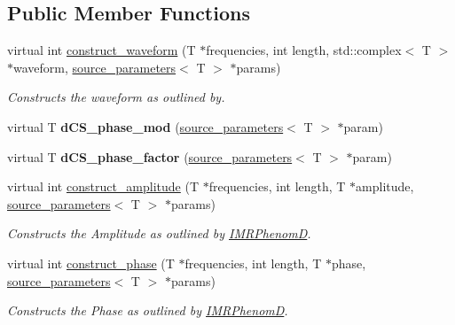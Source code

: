 \subsection*{Public Member Functions}
\begin{DoxyCompactItemize}
\item 
virtual int \hyperlink{classdCS__IMRPhenomD_ad6fa19d2181da900203c2bf1e182a60b}{construct\+\_\+waveform} (T $\ast$frequencies, int length, std\+::complex$<$ T $>$ $\ast$waveform, \hyperlink{structsource__parameters}{source\+\_\+parameters}$<$ T $>$ $\ast$params)
\begin{DoxyCompactList}\small\item\em Constructs the waveform as outlined by. \end{DoxyCompactList}\item 
\mbox{\label{classdCS__IMRPhenomD_a2325998d0af08e464343d7ae09c085be}} 
virtual T {\bfseries d\+C\+S\+\_\+phase\+\_\+mod} (\hyperlink{structsource__parameters}{source\+\_\+parameters}$<$ T $>$ $\ast$param)
\item 
\mbox{\label{classdCS__IMRPhenomD_ae2aeaa27abdfe564c0e87b20da4a1964}} 
virtual T {\bfseries d\+C\+S\+\_\+phase\+\_\+factor} (\hyperlink{structsource__parameters}{source\+\_\+parameters}$<$ T $>$ $\ast$param)
\item 
virtual int \hyperlink{classdCS__IMRPhenomD_ad9dbe0caa4aed7d22b8e6226114ed4d9}{construct\+\_\+amplitude} (T $\ast$frequencies, int length, T $\ast$amplitude, \hyperlink{structsource__parameters}{source\+\_\+parameters}$<$ T $>$ $\ast$params)
\begin{DoxyCompactList}\small\item\em Constructs the Amplitude as outlined by \hyperlink{classIMRPhenomD}{I\+M\+R\+PhenomD}. \end{DoxyCompactList}\item 
virtual int \hyperlink{classdCS__IMRPhenomD_aeee3339b07c8088fc6a1f2c3390f92a4}{construct\+\_\+phase} (T $\ast$frequencies, int length, T $\ast$phase, \hyperlink{structsource__parameters}{source\+\_\+parameters}$<$ T $>$ $\ast$params)
\begin{DoxyCompactList}\small\item\em Constructs the Phase as outlined by \hyperlink{classIMRPhenomD}{I\+M\+R\+PhenomD}. \end{DoxyCompactList}\end{DoxyCompactItemize}


